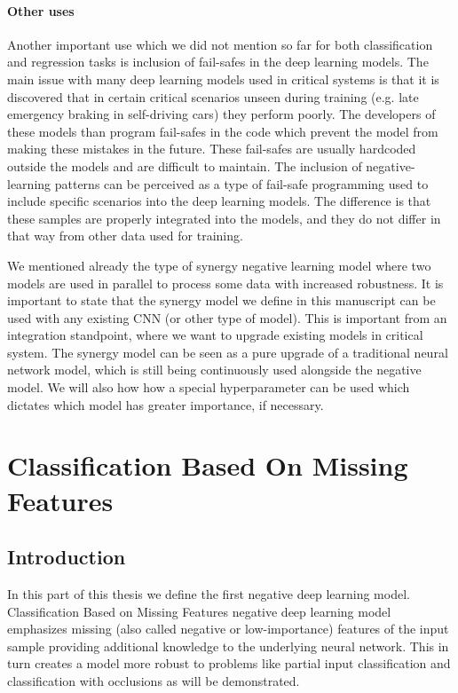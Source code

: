 \documentclass[b5paper]{book}
\begin{document}
\subsection{Other uses}

Another important use which we did not mention so far for both classification and regression tasks is inclusion of fail-safes in the deep learning models. The main issue with many deep learning models used in critical systems is that it is discovered that in certain critical scenarios unseen during training (e.g. late emergency braking in self-driving cars) they perform poorly. The developers of these models than program fail-safes in the code which prevent the model from making these mistakes in the future. These fail-safes are usually hardcoded outside the models and are difficult to maintain. The inclusion of negative-learning patterns can be perceived as a type of fail-safe programming used to include specific scenarios into the deep learning models. The difference is that these samples are properly integrated into the models, and they do not differ in that way from other data used for training.

We mentioned already the type of synergy negative learning model where two models are used in parallel to process some data with increased robustness. It is important to state that the synergy model we define in this manuscript can be used with any existing CNN (or other type of model). This is important from an integration standpoint, where we want to upgrade existing models in critical system. The synergy model can be seen as a pure upgrade of a traditional neural network model, which is still being continuously used alongside the negative model. We will also how how a special hyperparameter can be used which dictates which model has greater importance, if necessary.

\part{Classification Based On Missing Features}
\chapter{Introduction}

In this part of this thesis we define the first negative deep learning model. Classification Based on Missing Features negative deep learning model emphasizes missing (also called negative or low-importance) features of the input sample providing additional knowledge to the underlying neural network. This in turn creates a model more robust to problems like partial input classification and classification with occlusions as will be demonstrated.
\end{document}
